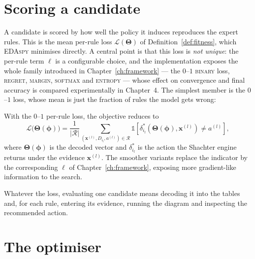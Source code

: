 \section{Scoring a candidate}

A candidate is scored by how well the policy it induces reproduces the
expert rules. This is the mean per-rule loss
$\mathcal{L}(\boldsymbol{\Theta})$ of
Definition~\ref{def:fitness}, which \textsc{EDAspy} minimises directly.
A central point is that this loss is \emph{not unique}: the per-rule
term $\ell$ is a configurable choice, and the implementation exposes the
whole family introduced in Chapter~\ref{ch:framework} — the $0$--$1$
\textsc{binary} loss, \textsc{regret}, \textsc{margin}, \textsc{softmax}
and \textsc{entropy} — whose effect on convergence and final accuracy is
compared experimentally in Chapter~4. The simplest member is the
$0$--$1$ loss, whose mean is just the fraction of rules the model gets
wrong:

\begin{definition}
\label{def:cost}
With the $0$--$1$ per-rule loss, the objective reduces to
\[
   \mathcal{L}\bigl(\boldsymbol{\Theta}(\boldsymbol{\phi})\bigr) =
   \frac{1}{|\mathcal{R}|}
   \sum_{(\mathbf{x}^{(l)}, D_{i_l}, a^{(l)})\in\mathcal{R}}
   \mathbb{1}\!\left[\delta^{*}_{i_l}\!\left(\boldsymbol{\Theta}
   (\boldsymbol{\phi}),\mathbf{x}^{(l)}\right) \neq a^{(l)}\right],
\]
where $\boldsymbol{\Theta}(\boldsymbol{\phi})$ is the decoded vector and
$\delta^{*}_{i_l}$ is the action the Shachter engine returns under the
evidence $\mathbf{x}^{(l)}$. The smoother variants replace the
indicator by the corresponding $\ell$ of
Chapter~\ref{ch:framework}, exposing more gradient-like information to
the search.
\end{definition}

Whatever the loss, evaluating one candidate means decoding it into the
tables and, for each rule, entering its evidence, running the diagram and
inspecting the recommended action.

\section{The optimiser}

